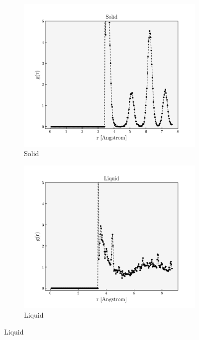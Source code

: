 \documentclass{IAYCPro}
\begin{document}
\begin{figure}[H]
\centering

\begin{subfigure}{0.49\textwidth}
    \includegraphics[width = 1\textwidth]{figs/solid.pdf}
    \caption{Solid}
    \label{fig: Solid}
\end{subfigure}
\begin{subfigure}{0.49\textwidth}
    \includegraphics[width = 1\textwidth]{figs/liquid.pdf}
    \caption{Liquid}
    \label{fig: Liquid}
\end{subfigure}

\end{figure}
\end{document}
